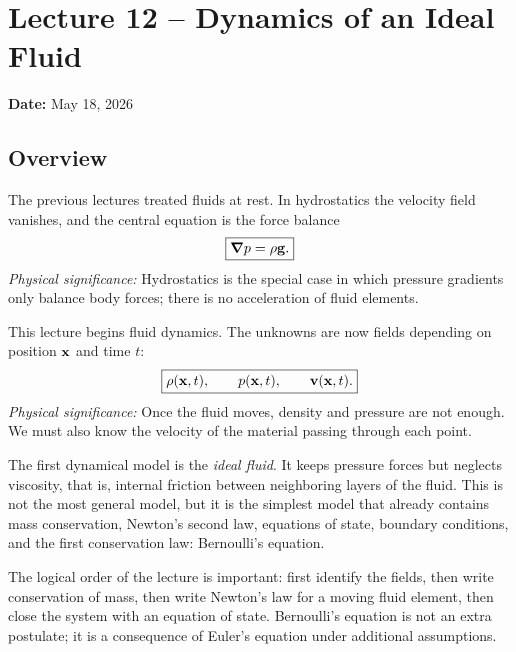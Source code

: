 \documentclass[../main.tex]{subfiles}
\begin{document}
\section{Lecture 12 -- Dynamics of an Ideal Fluid}\label{sec:lec12}
\date{May 18, 2026}
\begin{center}
  \textbf{Date:} May 18, 2026
\end{center}

\subsection*{Overview}
The previous lectures treated fluids at rest. In hydrostatics the velocity field vanishes, and the central equation is the force balance
\begin{equation}
  \boxed{\grad p=\rho \mathbf{g}.}
  \label{eq:lec12_hydrostatic_recall}
\end{equation}
\textit{Physical significance:} Hydrostatics is the special case in which pressure gradients only balance body forces; there is no acceleration of fluid elements.

This lecture begins fluid dynamics. The unknowns are now fields depending on position $\mathbf{x}$ and time $t$:
\begin{equation}
  \boxed{\rho(\mathbf{x},t),\qquad p(\mathbf{x},t),\qquad \mathbf{v}(\mathbf{x},t).}
  \label{eq:lec12_fluid_fields}
\end{equation}
\textit{Physical significance:} Once the fluid moves, density and pressure are not enough. We must also know the velocity of the material passing through each point.

The first dynamical model is the \emph{ideal fluid}. It keeps pressure forces but neglects viscosity, that is, internal friction between neighboring layers of the fluid. This is not the most general model, but it is the simplest model that already contains mass conservation, Newton's second law, equations of state, boundary conditions, and the first conservation law: Bernoulli's equation.

\begin{note}
The logical order of the lecture is important: first identify the fields, then write conservation of mass, then write Newton's law for a moving fluid element, then close the system with an equation of state. Bernoulli's equation is not an extra postulate; it is a consequence of Euler's equation under additional assumptions.
\end{note}

\end{document}
